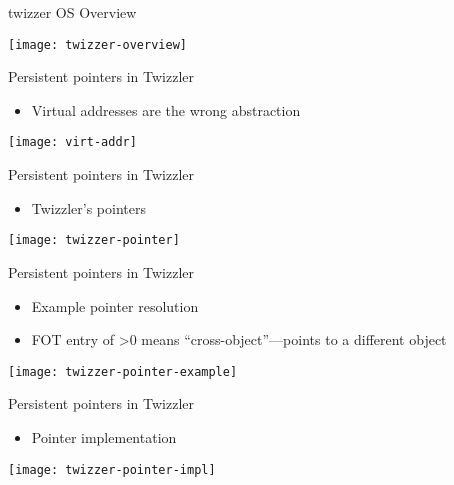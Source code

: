 \begin{frame}

   twizzer OS Overview
       
    \texttt{[image: twizzer-overview]}

\end{frame}


\begin{frame}
    
    Persistent pointers in Twizzler    
    \begin{itemize}
      \item Virtual addresses are the wrong abstraction
    \end{itemize}
    \texttt{[image: virt-addr]}
    
\end{frame}

\begin{frame}
    
    Persistent pointers in Twizzler    
    \begin{itemize}
        \item Twizzler’s pointers        
    \end{itemize}
    \texttt{[image: twizzer-pointer]}
    
\end{frame}

\begin{frame}
    
    Persistent pointers in Twizzler    
    \begin{itemize}
        \item Example pointer resolution
        \item FOT entry of >0 means “cross-object”—points to a different object        
    \end{itemize}
    \texttt{[image: twizzer-pointer-example]}
    
\end{frame}

\begin{frame}
    
    Persistent pointers in Twizzler    
    \begin{itemize}
        \item Pointer implementation                
    \end{itemize}
    \texttt{[image: twizzer-pointer-impl]}
    
\end{frame}

